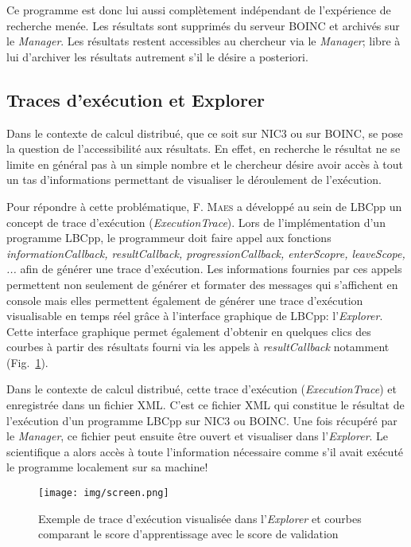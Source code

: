 \documentclass[a4paper, 12pt]{report}
\begin{document}
Ce programme est donc lui aussi complètement indépendant de l'expérience de recherche menée. Les résultats sont supprimés du serveur \textsc{BOINC} et archivés sur le \textit{Manager}. Les résultats restent accessibles au chercheur via le \textit{Manager}; libre à lui d'archiver les résultats autrement s'il le désire a posteriori.

\subsection{Traces d'exécution et Explorer}
\label{lbcppexplorer}
Dans le contexte de calcul distribué, que ce soit sur NIC3 ou sur \textsc{BOINC}, se pose la question de l'accessibilité aux résultats. En effet, en recherche le résultat ne se limite en général pas à un simple nombre et le chercheur désire avoir accès à tout un tas d'informations permettant de visualiser le déroulement de l'exécution.

Pour répondre à cette problématique, F. \textsc{Maes} a développé au sein de LBCpp un concept de trace d'exécution (\textit{ExecutionTrace}). Lors de l'implémentation d'un programme LBCpp, le programmeur doit faire appel aux fonctions \textit{informationCallback, resultCallback, progressionCallback, enterScopre, leaveScope, ...} afin de générer une trace d'exécution. Les informations fournies par ces appels permettent non seulement de générer et formater des messages qui s'affichent en console mais elles permettent également de générer une trace d'exécution visualisable en temps réel grâce à l'interface graphique de LBCpp: l'\textit{Explorer}. Cette interface graphique permet également d'obtenir en quelques clics des courbes à partir des résultats fourni via les appels à \textit{resultCallback} notamment (Fig.~\ref{explorer1}).

Dans le contexte de calcul distribué, cette trace d'exécution (\textit{ExecutionTrace}) et enregistrée dans un fichier XML. C'est ce fichier XML qui constitue le résultat de l'exécution d'un programme LBCpp sur NIC3 ou \textsc{BOINC}. Une fois récupéré par le \textit{Manager}, ce fichier peut ensuite être ouvert et visualiser dans l'\textit{Explorer}. Le scientifique a alors accès à toute l'information nécessaire comme s'il avait exécuté le programme localement sur sa machine!

\begin{figure}[!tb]
\centering
\texttt{[image: img/screen.png]}
\caption{Exemple de trace d'exécution visualisée dans l'\textit{Explorer} et courbes comparant le score d'apprentissage avec le score de validation}
\label{explorer1}
\end{figure}
\newpage
\end{document}
